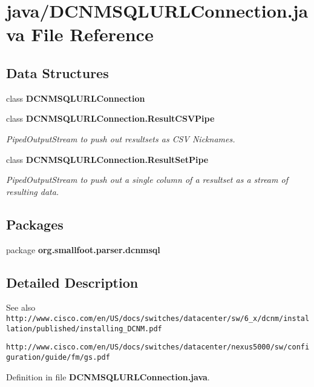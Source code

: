 \section{java/\+D\+C\+N\+M\+S\+Q\+L\+U\+R\+L\+Connection.java File Reference}
\label{DCNMSQLURLConnection_8java}
\subsection*{Data Structures}
\begin{DoxyCompactItemize}
\item 
class {\bf D\+C\+N\+M\+S\+Q\+L\+U\+R\+L\+Connection}
\item 
class {\bfseries D\+C\+N\+M\+S\+Q\+L\+U\+R\+L\+Connection.\+Result\+C\+S\+V\+Pipe}
\begin{DoxyCompactList}\small\item\em Piped\+Output\+Stream to push out resultsets as C\+S\+V Nicknames. \end{DoxyCompactList}\item 
class {\bfseries D\+C\+N\+M\+S\+Q\+L\+U\+R\+L\+Connection.\+Result\+Set\+Pipe}
\begin{DoxyCompactList}\small\item\em Piped\+Output\+Stream to push out a single column of a resultset as a stream of resulting data. \end{DoxyCompactList}\end{DoxyCompactItemize}
\subsection*{Packages}
\begin{DoxyCompactItemize}
\item 
package {\bf org.\+smallfoot.\+parser.\+dcnmsql}
\end{DoxyCompactItemize}


\subsection{Detailed Description}
\begin{DoxySeeAlso}{See also}
{\tt http\+://www.\+cisco.\+com/en/\+U\+S/docs/switches/datacenter/sw/6\+\_\+x/dcnm/installation/published/installing\+\_\+\+D\+C\+N\+M.\+pdf} 

{\tt http\+://www.\+cisco.\+com/en/\+U\+S/docs/switches/datacenter/nexus5000/sw/configuration/guide/fm/gs.\+pdf} 
\end{DoxySeeAlso}


Definition in file {\bf D\+C\+N\+M\+S\+Q\+L\+U\+R\+L\+Connection.\+java}.

